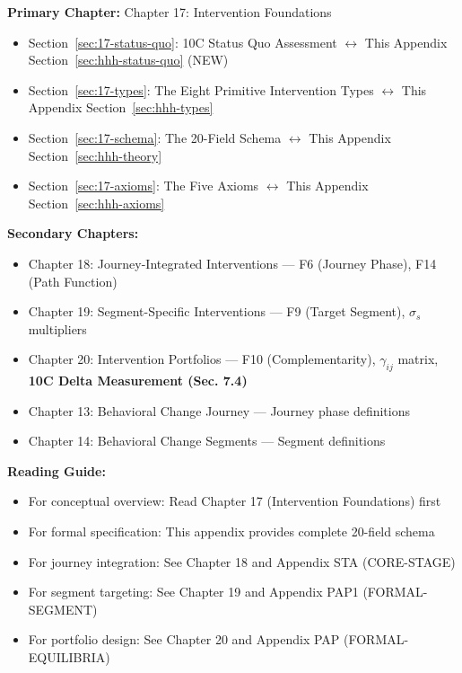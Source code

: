 \begin{tcolorbox}[colback=purple!5!white, colframe=purple!75!black,
    title=Chapter Linkage]

\textbf{Primary Chapter:} Chapter 17: Intervention Foundations
\begin{itemize}[nosep]
\item Section~\ref{sec:17-status-quo}: 10C Status Quo Assessment $\leftrightarrow$ This Appendix Section~\ref{sec:hhh-status-quo} (NEW)
\item Section~\ref{sec:17-types}: The Eight Primitive Intervention Types $\leftrightarrow$ This Appendix Section~\ref{sec:hhh-types}
\item Section~\ref{sec:17-schema}: The 20-Field Schema $\leftrightarrow$ This Appendix Section~\ref{sec:hhh-theory}
\item Section~\ref{sec:17-axioms}: The Five Axioms $\leftrightarrow$ This Appendix Section~\ref{sec:hhh-axioms}
\end{itemize}

\textbf{Secondary Chapters:}
\begin{itemize}[nosep]
\item Chapter 18: Journey-Integrated Interventions --- F6 (Journey Phase), F14 (Path Function)
\item Chapter 19: Segment-Specific Interventions --- F9 (Target Segment), $\sigma_s$ multipliers
\item Chapter 20: Intervention Portfolios --- F10 (Complementarity), $\gamma_{ij}$ matrix, \textbf{10C Delta Measurement (Sec. 7.4)}
\item Chapter 13: Behavioral Change Journey --- Journey phase definitions
\item Chapter 14: Behavioral Change Segments --- Segment definitions
\end{itemize}

\textbf{Reading Guide:}
\begin{itemize}[nosep]
\item For conceptual overview: Read Chapter 17 (Intervention Foundations) first
\item For formal specification: This appendix provides complete 20-field schema
\item For journey integration: See Chapter 18 and Appendix STA (CORE-STAGE)
\item For segment targeting: See Chapter 19 and Appendix PAP1 (FORMAL-SEGMENT)
\item For portfolio design: See Chapter 20 and Appendix PAP (FORMAL-EQUILIBRIA)
\end{itemize}

\end{tcolorbox}

